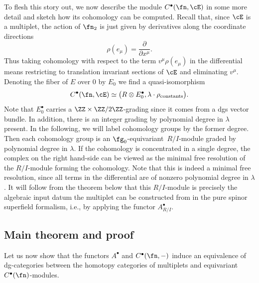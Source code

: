 To flesh this story out, we now describe the module $C^\bullet(\fn , \cE)$ in some more detail and sketch how its cohomology can be computed. Recall that, since $\cE$ is a multiplet, the action of $\fn_2$ is just given by derivatives along the coordinate directions
\begin{equation*}
\rho(e_\mu) = \frac{\partial}{\partial x^\mu} .
\end{equation*}
Thus taking cohomology with respect to the term $v^\mu \rho(e_\mu)$ in the differential means restricting to translation invariant sections of $\cE$ and eliminating $v^\mu$. Denoting the fiber of $E$ over 0 by $E_0$ we find a quasi-isomorphism
\begin{equation} \label{eq: compute C^bu}
C^\bullet(\fn ,\cE) \simeq \big( R \otimes E_0^\bullet , \lambda \cdot \rho_{\mathrm{constants}} \big) .
\end{equation}
Note that $E_0^\bullet$ carries a $\ZZ \times \ZZ/2\ZZ$-grading since it comes from a dgs vector bundle. In addition, there is an integer grading by polynomial degree in $\lambda$ present. In the following, we will label cohomology groups by the former degree. Then each cohomology group is an $\fg_0$-equivariant~$R/I$-module graded by polynomial degree in $\lambda$. If the cohomology is concentrated in a single degree, the complex on the right hand-side can be viewed as the minimal free resolution of the $R/I$-module forming the cohomology. Note that this is indeed a minimal free resolution, since all terms in the differential are of nonzero polynomial degree in $\lambda$. It will follow from the theorem below that this $R/I$-module is precisely the algebraic input datum the multiplet can be constructed from in the pure spinor superfield formalism, i.e., by applying the functor $A^\bullet_{R/I}$.


\subsection{Main theorem and proof}
Let us now show that the functors $A^\bullet$ and $C^\bullet(\fn,-)$ induce an equivalence of dg-categories between the homotopy categories of multiplets and equivariant $C^\bullet({\fn})$-modules.

